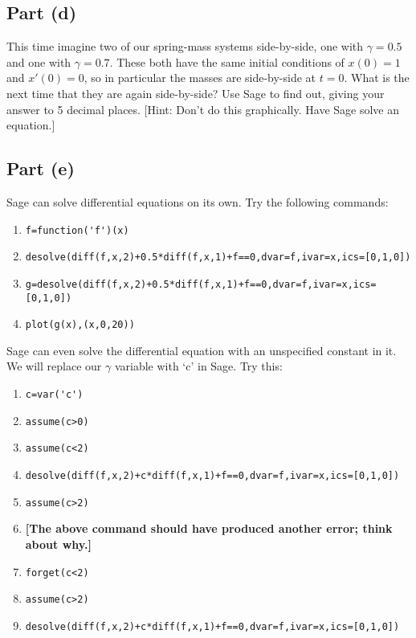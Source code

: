 \documentclass[letterpaper, 12pt]{amsart}
\theoremstyle{definition}  %
\begin{document}
		\subsection*{Part (d)}
		This time imagine two of our spring-mass systems side-by-side, one with $\gamma = 0.5$ and one with $\gamma = 0.7$. 
		These both have the same initial conditions of $x(0) = 1$ and $x'(0) = 0$, so in particular the masses are side-by-side at $t = 0$. 
		What is the next time that they are again side-by-side? 
		Use Sage to find out, giving your answer to 5 decimal places. 
		[Hint: Don’t do this graphically. 
		Have Sage solve an equation.]

		\subsection*{Part (e)}
		Sage can solve differential equations on its own. 
		Try the following commands:
			\begin{enumerate}[]
				\item \verb|f=function('f')(x)|

				\item \verb|desolve(diff(f,x,2)+0.5*diff(f,x,1)+f==0,dvar=f,ivar=x,ics=[0,1,0])|

				\item \verb|g=desolve(diff(f,x,2)+0.5*diff(f,x,1)+f==0,dvar=f,ivar=x,ics=[0,1,0])|

				\item \verb|plot(g(x),(x,0,20))|
			\end{enumerate}
		Sage can even solve the differential equation with an unspecified constant in it. 
		We will replace our $\gamma$ variable with `c' in Sage. 
		Try this:
			\begin{enumerate}[]
				\item \verb|c=var('c')|

				\item \verb|assume(c>0)|

				\item \verb|assume(c<2)|

				\item \verb|desolve(diff(f,x,2)+c*diff(f,x,1)+f==0,dvar=f,ivar=x,ics=[0,1,0])|

				\item \verb|assume(c>2)|

				\item \textbf{[The above command should have produced another error; think about why.]}

				\item \verb|forget(c<2)|

				\item \verb|assume(c>2)|

				\item \verb|desolve(diff(f,x,2)+c*diff(f,x,1)+f==0,dvar=f,ivar=x,ics=[0,1,0])|
			\end{enumerate}
			
\end{document}
